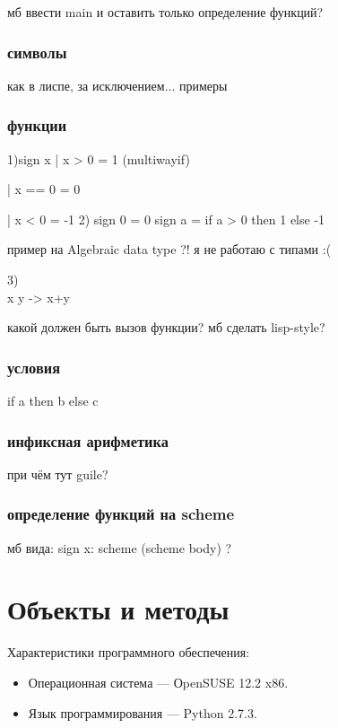 \documentclass[12pt,a4paper,oneside]{extarticle}
\begin{document}
        мб ввести main и оставить только определение функций?

        \subsubsection{символы}
            как в лиспе, за исключением... 
            примеры
        \subsubsection{функции}
            1)sign x  | x > 0  = 1 (multiwayif)

                | x == 0 = 0

                | x < 0  = -1
            2) sign 0 = 0 
            sign a = if a > 0 then 1 else -1

            пример на Algebraic data type ?! я не работаю с типами :(

            3) \\x y -> x+y 

            какой должен быть вызов функции? мб сделать lisp-style?
        \subsubsection{условия}
            if a then b else c

        \subsubsection{инфиксная арифметика}
            при чём тут guile?
        \subsubsection{определение функций на scheme}
            мб вида: sign x: scheme (scheme body) ?

        
\clearpage

\section{Объекты и методы}
\label{sec:configuration} 
        \noindent Характеристики программного обеспечения:
        \begin{itemize}
            \item Операционная система --- ОpenSUSE 12.2 x86.
            \item Язык программирования --- Python 2.7.3.
        \end{itemize}
        
\end{document}
